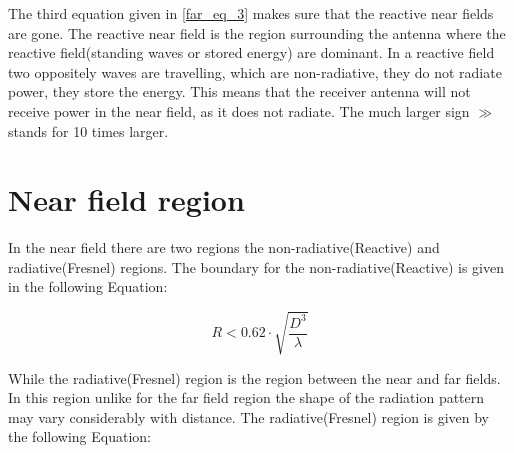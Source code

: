 
The third equation given in \ref{far_eq_3} makes sure that the reactive near fields are gone. The reactive near field is the region surrounding the antenna where the reactive field(standing waves or stored energy) are dominant. In a reactive field two oppositely waves are travelling, which are non-radiative, they do not radiate power, they store the energy. This means that the receiver antenna will not receive power in the near field, as it does not radiate. %
The much larger sign $\gg$ stands for 10 times larger. 













\section{Near field region}

In the near field there are two regions the non-radiative(Reactive) and radiative(Fresnel) regions. The boundary for the non-radiative(Reactive) is given in the following Equation:

\begin{equation}
R < 0.62 \cdot \sqrt{\frac{D^{3}}{\lambda}}
\label{near_field_eq}
\end{equation}


While the radiative(Fresnel) region is the region between the near and far fields. In this region unlike for the far field region the shape of the radiation pattern may vary considerably with distance. The radiative(Fresnel) region is given by the following Equation:


